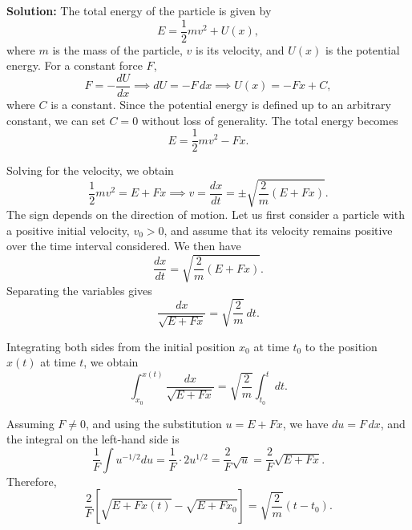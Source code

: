 \documentclass[../main.tex]{subfiles}
\begin{document}
\textbf{Solution:}
The total energy of the particle is given by
\begin{equation}
    E = \frac{1}{2}mv^2 + U(x),
\end{equation}
where $m$ is the mass of the particle, $v$ is its velocity, and $U(x)$ is the potential energy. For a constant force $F$,
\begin{equation}
    F = -\frac{dU}{dx}
    \implies dU = -F\,dx
    \implies U(x) = -Fx + C,
\end{equation}
where $C$ is a constant. Since the potential energy is defined up to an arbitrary constant, we can set $C = 0$ without loss of generality. The total energy becomes
\begin{equation}
    E = \frac{1}{2}mv^2 - Fx.
\end{equation}

Solving for the velocity, we obtain
\begin{equation}
    \frac{1}{2}mv^2 = E + Fx
    \implies
    v = \frac{dx}{dt}
    = \pm\sqrt{\frac{2}{m}(E+Fx)}.
\end{equation}
The sign depends on the direction of motion. Let us first consider a particle with a positive initial velocity, $v_0>0$, and assume that its velocity remains positive over the time interval considered. We then have
\begin{equation}
    \frac{dx}{dt} = \sqrt{\frac{2}{m}(E+Fx)}.
\end{equation}
Separating the variables gives
\begin{equation}
    \frac{dx}{\sqrt{E+Fx}}
    = \sqrt{\frac{2}{m}}\,dt.
\end{equation}

Integrating both sides from the initial position $x_0$ at time $t_0$ to the position $x(t)$ at time $t$, we obtain
\begin{equation}
    \int_{x_0}^{x(t)}
    \frac{dx}{\sqrt{E+Fx}}
    =
    \sqrt{\frac{2}{m}}
    \int_{t_0}^{t}dt.
\end{equation}

Assuming $F\neq 0$, and using the substitution $u = E + Fx$, we have $du = F\,dx$, and the integral on the left-hand side is
\begin{equation}
    \frac{1}{F} \int u^{-1/2} du = \frac{1}{F} \cdot 2u^{1/2} = \frac{2}{F}\sqrt{u} = \frac{2}{F}\sqrt{E+Fx}.
\end{equation}
Therefore,
\begin{equation}
    \frac{2}{F}
    \left[
        \sqrt{E+Fx(t)}
        -\sqrt{E+Fx_0}
    \right]
    =
    \sqrt{\frac{2}{m}}(t-t_0).
\end{equation}
\end{document}
